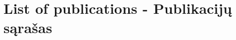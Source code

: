 \chapter*{List of publications - Publikacijų sąrašas}
\label{cha:publications} 

%



\makeatletter
\newcommand{\authorpaperlabel}[2]{%
    \@bsphack
    \begingroup
        \def\label@name{#1}%
        \label@hook
        \protected@write\@auxout{}{
            \string\newlabel{#1}{%
                {#2} %
                {\thepage} %
                {\@currentlabelname}%
                {\@currentHref}%
                {}%
            } %
        }%
    \endgroup
    \@esphack
}%
\makeatother
  
\newenvironment{publicationlist}[1]{%
\setcounter{itemnumber}{0}%
\begin{list}{\textbf{#1}}{}%
}{\end{list}}

